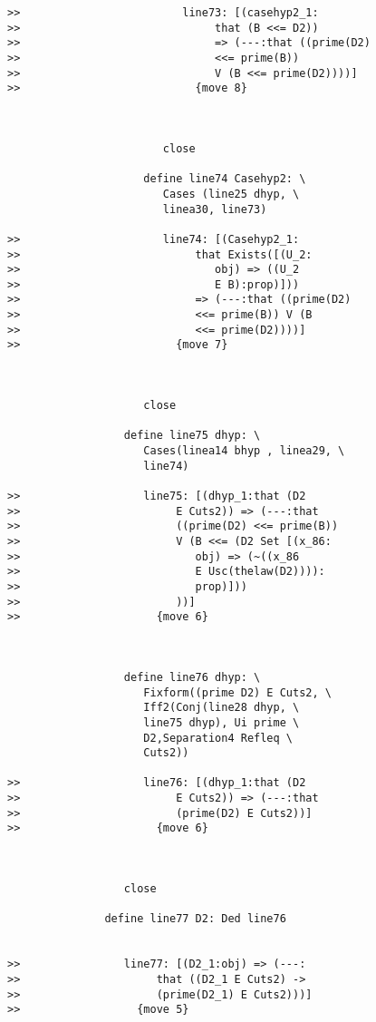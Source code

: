 \documentclass[12pt]{article}
\begin{document}
\begin{verbatim}
>>                         line73: [(casehyp2_1:
>>                              that (B <<= D2))
>>                              => (---:that ((prime(D2)
>>                              <<= prime(B))
>>                              V (B <<= prime(D2))))]
>>                           {move 8}



                        close

                     define line74 Casehyp2: \
                        Cases (line25 dhyp, \
                        linea30, line73)

>>                      line74: [(Casehyp2_1:
>>                           that Exists([(U_2:
>>                              obj) => ((U_2
>>                              E B):prop)]))
>>                           => (---:that ((prime(D2)
>>                           <<= prime(B)) V (B
>>                           <<= prime(D2))))]
>>                        {move 7}



                     close

                  define line75 dhyp: \
                     Cases(linea14 bhyp , linea29, \
                     line74)

>>                   line75: [(dhyp_1:that (D2
>>                        E Cuts2)) => (---:that
>>                        ((prime(D2) <<= prime(B))
>>                        V (B <<= (D2 Set [(x_86:
>>                           obj) => (~((x_86
>>                           E Usc(thelaw(D2)))):
>>                           prop)]))
>>                        ))]
>>                     {move 6}



                  define line76 dhyp: \
                     Fixform((prime D2) E Cuts2, \
                     Iff2(Conj(line28 dhyp, \
                     line75 dhyp), Ui prime \
                     D2,Separation4 Refleq \
                     Cuts2))

>>                   line76: [(dhyp_1:that (D2
>>                        E Cuts2)) => (---:that
>>                        (prime(D2) E Cuts2))]
>>                     {move 6}



                  close

               define line77 D2: Ded line76


>>                line77: [(D2_1:obj) => (---:
>>                     that ((D2_1 E Cuts2) ->
>>                     (prime(D2_1) E Cuts2)))]
>>                  {move 5}




\end{verbatim}
\end{document}

